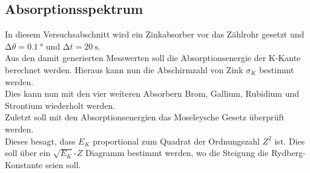\subsection{Absorptionsspektrum}

In diesem Versuchsabschnitt wird ein Zinkabsorber vor das Zählrohr gesetzt und $\increment \theta=\SI{0.1}{\degree}$ und $\increment t=\SI{20}{\second}$.\\
Aus den damit generierten Messwerten soll die Absorptionsenergie der K-Kante berechnet werden. Hieraus kann nun die Abschirmzahl von Zink $\sigma_K$ bestimmt werden.\\
Dies kann nun mit den vier weiteren Absorbern Brom, Gallium, Rubidium und Strontium wiederholt werden.\\
Zuletzt soll mit den Absorptionsenergien das Moseleysche Gesetz überprüft werden.\\
Dieses besagt, dass $E_K$ proportional zum Quadrat der Ordnungszahl $Z^2$ ist. Dies soll über ein $\sqrt{E_K}$-$Z$ Diagramm bestimmt werden, wo die Steigung die Rydberg-Konstante seien soll. 